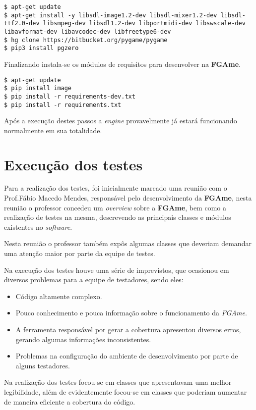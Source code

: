 \begin{lstlisting}
$ apt-get update
$ apt-get install -y libsdl-image1.2-dev libsdl-mixer1.2-dev libsdl-ttf2.0-dev libsmpeg-dev libsdl1.2-dev libportmidi-dev libswscale-dev libavformat-dev libavcodec-dev libfreetype6-dev
$ hg clone https://bitbucket.org/pygame/pygame
$ pip3 install pgzero
\end{lstlisting}

Finalizando instala-se os módulos de requisitos para desenvolver na \textbf{FGAme}.

\begin{lstlisting}
$ apt-get update
$ pip install image
$ pip install -r requirements-dev.txt
$ pip install -r requirements.txt
\end{lstlisting}

Após a execução destes passos a \textit{engine} provavelmente já estará funcionando normalmente em sua totalidade.

\section{Execução dos testes}

Para a realização dos testes, foi inicialmente marcado uma reunião com o Prof.Fábio Macedo Mendes, responsável pelo desenvolvimento da \textbf{FGAme}, nesta reunião o professor concedeu um \textit{overview} sobre a \textbf{FGAme}, bem como a realização de testes na mesma, descrevendo as principais classes e módulos existentes no \textit{software}.

Nesta reunião o professor também expôs algumas classes que deveriam demandar uma atenção maior por parte da equipe de testes. 

Na execução dos testes houve uma série de imprevistos, que ocasionou em diversos problemas para a equipe de testadores, sendo eles:

\begin{itemize}
\item Código altamente complexo.
\item Pouco conhecimento e pouca informação sobre o funcionamento da \textit{FGAme}.
\item A ferramenta responsável por gerar a cobertura apresentou diversos erros, gerando algumas informações inconsistentes.
\item Problemas na configuração do ambiente de desenvolvimento por parte de alguns testadores.
\end{itemize}


Na realização dos testes focou-se em classes que apresentavam uma melhor legibilidade, além de evidentemente focou-se em classes que poderiam aumentar de maneira eficiente a cobertura do código.

